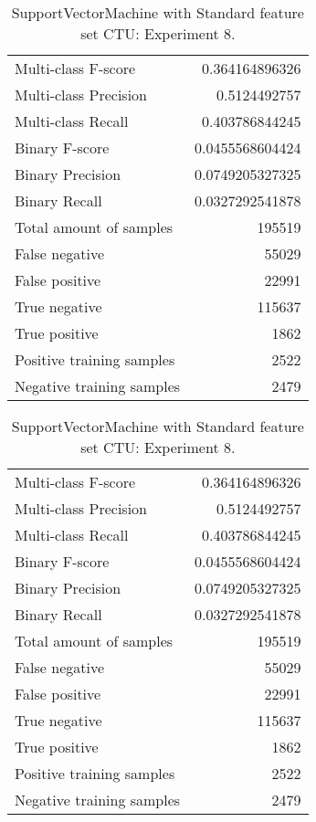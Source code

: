 \begin{table}[H]
\begin{minipage}{0.5\textwidth}
\caption{SupportVectorMachine with Standard feature set CTU: Experiment 7.}
\centering
\begin{tabular}{l r}
\toprule
Multi-class F-score & 0.364164896326 \\
Multi-class Precision & 0.5124492757 \\
Multi-class Recall & 0.403786844245 \\
\midrule
Binary F-score & 0.0455568604424 \\
Binary Precision & 0.0749205327325 \\
Binary Recall & 0.0327292541878 \\
\midrule
Total amount of samples & 195519 \\
False negative & 55029 \\
False positive & 22991 \\
True negative & 115637 \\
True positive & 1862 \\
\midrule
Positive training samples & 2522 \\
Negative training samples & 2479 \\
\bottomrule
\end{tabular}
\end{minipage}
\hfillx
\begin{minipage}{0.5\textwidth}
\caption{SupportVectorMachine with Standard feature set CTU: Experiment 8.}
\centering
\begin{tabular}{l r}
\toprule
Multi-class F-score & 0.364164896326 \\
Multi-class Precision & 0.5124492757 \\
Multi-class Recall & 0.403786844245 \\
\midrule
Binary F-score & 0.0455568604424 \\
Binary Precision & 0.0749205327325 \\
Binary Recall & 0.0327292541878 \\
\midrule
Total amount of samples & 195519 \\
False negative & 55029 \\
False positive & 22991 \\
True negative & 115637 \\
True positive & 1862 \\
\midrule
Positive training samples & 2522 \\
Negative training samples & 2479 \\
\bottomrule
\end{tabular}
\end{minipage}
\end{table}
